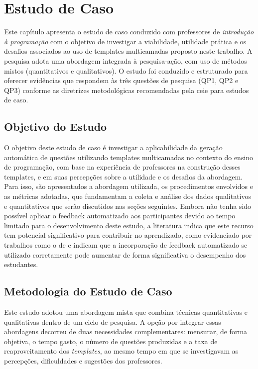 \chapter{Estudo de Caso}

Este capítulo apresenta o estudo de caso conduzido com professores de \textit{introdução à programação} com o objetivo de investigar a viabilidade, utilidade prática e os desafios associados ao uso de templates multicamadas proposto neste trabalho. A pesquisa adota uma abordagem integrada à pesquisa-ação, com uso de métodos mistos (quantitativos e qualitativos). O estudo foi conduzido e estruturado para oferecer evidências que respondem às três questões de pesquisa (QP1, QP2 e QP3) conforme as diretrizes metodológicas recomendadas pela \gls{ceie} para estudos de caso.

\section{Objetivo do Estudo}
O objetivo deste estudo de caso é investigar a aplicabilidade da geração automática de questões utilizando templates multicamadas no contexto do ensino de programação, com base na experiência de professores na construção desses templates, e em suas percepções sobre a utilidade e os desafios da abordagem. Para isso, são apresentados a abordagem utilizada,  os procedimentos envolvidos e as métricas adotadas, que fundamentam a coleta e análise dos dados qualitativos e quantitativos que serão discutidos nas seções seguintes.
Embora não tenha sido possível aplicar o feedback automatizado aos participantes devido ao tempo limitado para o desenvolvimento deste estudo, a literatura  indica que este recurso tem potencial significativo para contribuir no aprendizado, como evidenciado por trabalhos como o de \parencite{vanpraet2024} e \parencite{fung2024} indicam que a incorporação de feedback automatizado se utilizado corretamente pode aumentar de forma significativa o desempenho dos estudantes.

\section{Metodologia do Estudo de Caso}

Este estudo adotou uma abordagem mista que combina técnicas quantitativas e qualitativas dentro de um ciclo de pesquisa. A opção por integrar essas abordagens decorreu de duas necessidades complementares: mensurar, de forma objetiva, o tempo gasto, o número de questões produzidas e a taxa de reaproveitamento dos \textit{templates}, ao mesmo tempo em que se investigavam as percepções, dificuldades e sugestões dos professores.


